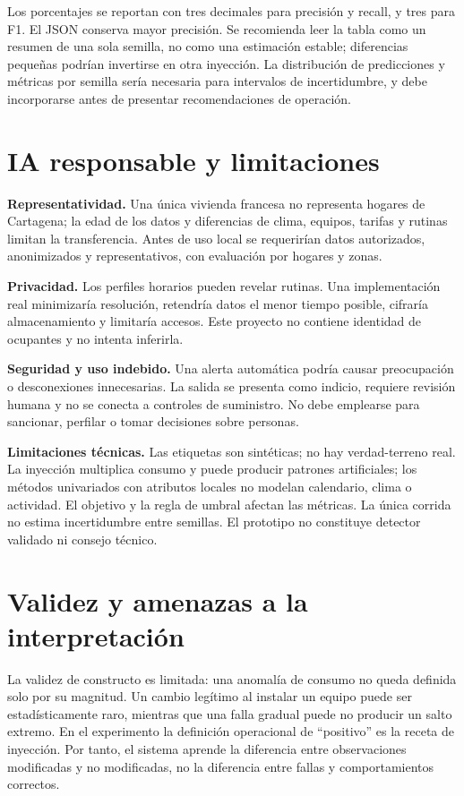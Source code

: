 \documentclass[10pt,twocolumn]{article}
\begin{document}
Los porcentajes se reportan con tres decimales para precisión y recall, y tres para F1. El JSON conserva mayor precisión. Se recomienda leer la tabla como un resumen de una sola semilla, no como una estimación estable; diferencias pequeñas podrían invertirse en otra inyección. La distribución de predicciones y métricas por semilla sería necesaria para intervalos de incertidumbre, y debe incorporarse antes de presentar recomendaciones de operación.

\section{IA responsable y limitaciones}
\textbf{Representatividad.} Una única vivienda francesa no representa hogares de Cartagena; la edad de los datos y diferencias de clima, equipos, tarifas y rutinas limitan la transferencia. Antes de uso local se requerirían datos autorizados, anonimizados y representativos, con evaluación por hogares y zonas.

\textbf{Privacidad.} Los perfiles horarios pueden revelar rutinas. Una implementación real minimizaría resolución, retendría datos el menor tiempo posible, cifraría almacenamiento y limitaría accesos. Este proyecto no contiene identidad de ocupantes y no intenta inferirla.

\textbf{Seguridad y uso indebido.} Una alerta automática podría causar preocupación o desconexiones innecesarias. La salida se presenta como indicio, requiere revisión humana y no se conecta a controles de suministro. No debe emplearse para sancionar, perfilar o tomar decisiones sobre personas.

\textbf{Limitaciones técnicas.} Las etiquetas son sintéticas; no hay verdad-terreno real. La inyección multiplica consumo y puede producir patrones artificiales; los métodos univariados con atributos locales no modelan calendario, clima o actividad. El objetivo y la regla de umbral afectan las métricas. La única corrida no estima incertidumbre entre semillas. El prototipo no constituye detector validado ni consejo técnico.

\section{Validez y amenazas a la interpretación}
La validez de constructo es limitada: una anomalía de consumo no queda definida solo por su magnitud. Un cambio legítimo al instalar un equipo puede ser estadísticamente raro, mientras que una falla gradual puede no producir un salto extremo. En el experimento la definición operacional de “positivo” es la receta de inyección. Por tanto, el sistema aprende la diferencia entre observaciones modificadas y no modificadas, no la diferencia entre fallas y comportamientos correctos.
\end{document}
